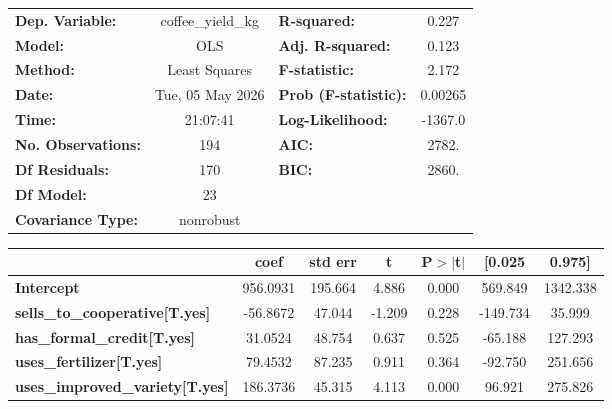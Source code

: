 \begin{center}
\begin{tabular}{lclc}
\toprule
\textbf{Dep. Variable:}                 & coffee\_yield\_kg & \textbf{  R-squared:         } &     0.227   \\
\textbf{Model:}                         &        OLS        & \textbf{  Adj. R-squared:    } &     0.123   \\
\textbf{Method:}                        &   Least Squares   & \textbf{  F-statistic:       } &     2.172   \\
\textbf{Date:}                          &  Tue, 05 May 2026 & \textbf{  Prob (F-statistic):} &  0.00265    \\
\textbf{Time:}                          &      21:07:41     & \textbf{  Log-Likelihood:    } &   -1367.0   \\
\textbf{No. Observations:}              &          194      & \textbf{  AIC:               } &     2782.   \\
\textbf{Df Residuals:}                  &          170      & \textbf{  BIC:               } &     2860.   \\
\textbf{Df Model:}                      &           23      & \textbf{                     } &             \\
\textbf{Covariance Type:}               &     nonrobust     & \textbf{                     } &             \\
\bottomrule
\end{tabular}
\begin{tabular}{lcccccc}
                                        & \textbf{coef} & \textbf{std err} & \textbf{t} & \textbf{P$> |$t$|$} & \textbf{[0.025} & \textbf{0.975]}  \\
\midrule
\textbf{Intercept}                      &     956.0931  &      195.664     &     4.886  &         0.000        &      569.849    &     1342.338     \\
\textbf{sells\_to\_cooperative[T.yes]}  &     -56.8672  &       47.044     &    -1.209  &         0.228        &     -149.734    &       35.999     \\
\textbf{has\_formal\_credit[T.yes]}     &      31.0524  &       48.754     &     0.637  &         0.525        &      -65.188    &      127.293     \\
\textbf{uses\_fertilizer[T.yes]}        &      79.4532  &       87.235     &     0.911  &         0.364        &      -92.750    &      251.656     \\
\textbf{uses\_improved\_variety[T.yes]} &     186.3736  &       45.315     &     4.113  &         0.000        &       96.921    &      275.826     \\

\end{tabular}
\end{center}
